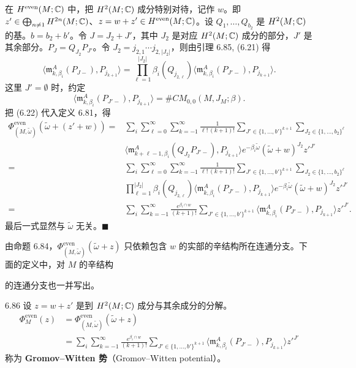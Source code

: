 在 $H^{\mathrm{even}}(M;\mathbb{C})$ 中，把 $H^2(M;\mathbb{C})$ 成分特别对待，记作 $w$。即 $z'\in\bigoplus_{n\ne1}H^{2n}(M;\mathbb{C})$、$z=w+z'\in H^{\mathrm{even}}(M;\mathbb{C})$。设 $Q_1,\dots,Q_{b_2}$ 是 $H^2(M;\mathbb{C})$ 的基。$b=b_2+b'$。令 $J=J_2+J'$，其中 $J_2$ 是对应 $H^2(M;\mathbb{C})$ 成分的部分，$J'$ 是其余部分。$P_J=Q_{J_2}P_{J'}$。令 $J_2=j_{2,1}\cdots j_{2,|J_2|}$，则由引理 6.85, (6.21) 得
\begin{equation}
  \big\langle\mathfrak{m}_{k,\beta_i}^A(P_{J-}),P_{j_{k+1}}\big\rangle
  =\prod_{\ell=1}^{|J_2|}\beta_i(Q_{j_{2,\ell}})
  \big\langle\mathfrak{m}_{k,\beta_i}^A(P_{J'-}),P_{j_{k+1}}\big\rangle . \tag{6.22}
\end{equation}
这里 $J'=\emptyset$ 时，约定
\[
  \big\langle\mathfrak{m}_{k,\beta_i}^A(P_{J'-}),P_{j_{k+1}}\big\rangle
  =\#CM_{0,0}(M,J_M;\beta).
\]
把 (6.22) 代入定义 6.81，得
\[
\begin{aligned}
  \Phi^{\mathrm{even}}_{(M,\tilde\omega)}(\tilde\omega+(z'+w))
  ={}&\sum_i\sum_{\ell=0}^\infty\sum_{k=-1}^\infty\frac{1}{\ell!\,(k+1)!}
  \sum_{J'\in\{1,\dots,b'\}^{k+1}}\sum_{J_2\in\{1,\dots,b_2\}^\ell}\\
  &\big\langle\mathfrak{m}_{k+\ell-1,\beta_i}^A(Q_{J_2}P_{J'-}),P_{j_{k+1}}\big\rangle
  e^{-\beta_i\tilde\omega}(\tilde\omega+w)^{J_2}z'^{J'}\\
  ={}&\sum_i\sum_{\ell=0}^\infty\sum_{k=-1}^\infty\frac{1}{\ell!\,(k+1)!}
  \sum_{J'\in\{1,\dots,b'\}^{k+1}}\sum_{J_2\in\{1,\dots,b_2\}^\ell}\\
  &\prod_{\ell=1}^{|J_2|}\beta_i(Q_{j_{2,\ell}})
  \big\langle\mathfrak{m}_{k,\beta_i}^A(P_{J'-}),P_{j_{k+1}}\big\rangle
  e^{-\beta_i\tilde\omega}(\tilde\omega+w)^{J_2}z'^{J'}\\
  ={}&\sum_i\sum_{k=-1}^\infty\frac{e^{\beta_i\cap w}}{(k+1)!}
  \sum_{J'\in\{1,\dots,b'\}^{k+1}}
  \big\langle\mathfrak{m}_{k,\beta_i}^A(P_{J'-}),P_{j_{k+1}}\big\rangle z'^{J'} .
\end{aligned}
\]
最后一式显然与 $\tilde\omega$ 无关。\hfill$\blacksquare$

由命题 6.84，$\Phi^{\mathrm{even}}_{(M,\tilde\omega)}(\tilde\omega+z)$ 只依赖包含 $w$ 的实部的辛结构所在连通分支。下面的定义中，对 $M$ 的辛结构

的连通分支也一并写出。

\begin{definition}{6.86}
  设 $z=w+z'$ 是到 $H^2(M;\mathbb{C})$ 成分与其余成分的分解。
  \[
  \begin{aligned}
    \Phi_M^{\mathrm{even}}(z)&=\Phi^{\mathrm{even}}_{(M,\tilde\omega)}(\tilde\omega+z)\\
    &=\sum_i\sum_{k=-1}^\infty\frac{e^{\beta_i\cap w}}{(k+1)!}
    \sum_{J'\in\{1,\dots,b'\}^{k+1}}
    \big\langle\mathfrak{m}_{k,\beta_i}^A(P_{J'-}),P_{j_{k+1}}\big\rangle z'^{J'}
  \end{aligned}
  \]
  称为 \textbf{Gromov–Witten 势}（Gromov–Witten potential）。
\end{definition}

